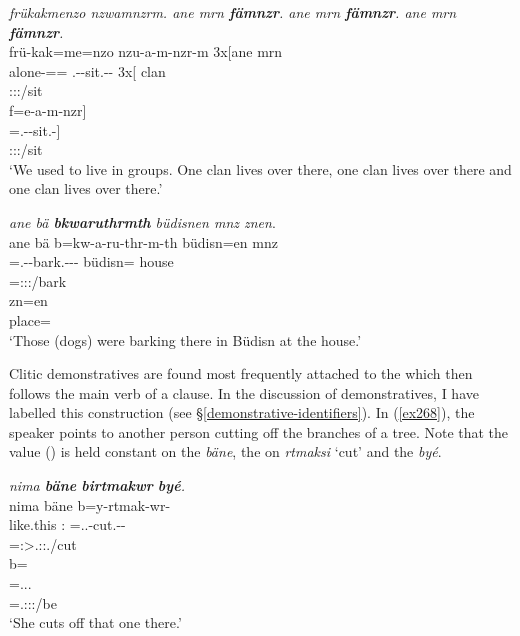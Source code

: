 \begin{exe}
	\ex \emph{frükakmenzo nzwamnzrm. ane mrn \textbf{fämnzr}. ane mrn \textbf{fämnzr}. ane mrn \textbf{fämnzr}.}\\
	\glll frü-kak=me=nzo nzu-a-m-nzr-m 3x[ane mrn\\
	alone-\Distr=\Ins=\Only{} \Fnsg.\Betatwo-\Vc-sit.\Ext-\Ndu-\Dur{} 3x[\Dem{} clan\\
	{} \footnotesize{\Fpl:\Sbj:\Pst:\Dur/sit} {} {}\\
	\sn
	\glll f=e-a-m-nzr]\\
	\Dist=\Stnsg.\Alph-\Vc-sit.\Ext-\Ndu]\\
	\footnotesize{\Stpl:\Sbj:\Nonpast:\Ipfv/sit}\\
	\trans `We used to live in groups. One clan lives over there, one clan lives over there and one clan lives over there.' 
	\label{ex266}
\end{exe}
\begin{exe}
	\ex \emph{ane bä \textbf{bkwaruthrmth} büdisnen mnz znen}.\\
	\glll ane bä b=kw-a-ru-thr-m-th büdisn=en mnz\\
	\Dem{} \Med{} \Med=\M.\Betaone-\Vc-bark.\Ext-\Ndu-\Dur-\Stnsg{} büdisn=\Loc{} house\\
	{} {} \footnotesize{\Med=\Stpl:\Sbj:\Pst:\Dur/bark} {} {} {}\\
	\sn
	\gll zn=en\\
	place=\Loc{}\\
	\trans `Those (dogs) were barking there in Büdisn at the house.' 
	\label{ex267}
\end{exe}

Clitic demonstratives are found most frequently attached to the  which then follows the main verb of a clause. In the discussion of demonstratives, I have labelled this construction   (see \S{}\ref{demonstrative-identifiers}). In (\ref{ex268}), the speaker points to another person cutting off the branches of a tree. Note that the  value (\Med) is held constant on the   \emph{bäne}, the   on \emph{rtmaksi} `cut' and the   \emph{byé}.

\begin{exe}
	\ex \emph{nima \textbf{bäne} \textbf{birtmakwr} \textbf{byé}.}\\
	\glll nima bäne b=y-rtmak-wr-\Zero{}\\
	like.this \Dem:\Med{} \Med=\Tsg.\Masc.\Alph-cut.\Ext-\Ndu-\Stsg{}\\
	{} {} \footnotesize{\Med=\Stsg:\Sbj>\Tsg.\Masc:\Obj:\Nonpast.\Ipfv/cut}\\
	\sn
	\glll b=\\
	\Med=\Tsg.\Masc.\Cop.\Ndu{}\\
	\footnotesize{\Med=\Tsg.\Masc:\Sbj:\Nonpast:\Ipfv/be}\\
	\trans `She cuts off that one there.' 
	\label{ex268}
\end{exe}

